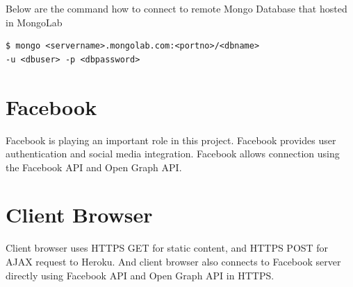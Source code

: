 Below are the command how to connect to remote Mongo Database that hosted in MongoLab

\begin{lstlisting}
$ mongo <servername>.mongolab.com:<portno>/<dbname> 
-u <dbuser> -p <dbpassword>
\end{lstlisting}

\section{Facebook}
Facebook is playing an important role in this project. Facebook provides user authentication and social media integration. Facebook allows connection using the Facebook API and Open Graph API.

\section{Client Browser}
Client browser uses HTTPS GET for static content, and HTTPS POST for AJAX request to Heroku. And client browser also connects to Facebook server directly using Facebook API and Open Graph API in HTTPS.
 
